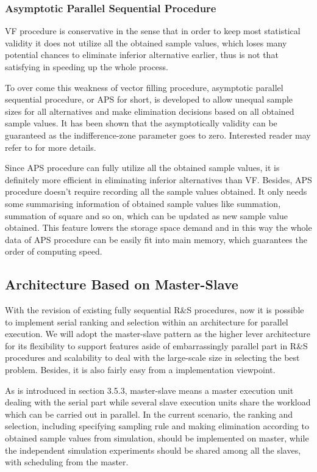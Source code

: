 \documentclass[12pt,a4paper]{report}
\begin{document}
\subsubsection{Asymptotic Parallel Sequential Procedure}

VF procedure is conservative in the sense that in order to keep most statistical validity it does not utilize all the obtained sample values, which loses many potential chances to eliminate inferior alternative earlier, thus is not that satisfying in speeding up the whole process.

To over come this weakness of vector filling procedure, asymptotic parallel sequential procedure, or APS for short, is developed to allow unequal sample sizes for all alternatives and make elimination decisions based on all obtained sample values. It has been shown that the asymptotically validity can be guaranteed as the indifference-zone parameter goes to zero. Interested reader may refer to \cite{ras-seq-parallel} for more details.

Since APS procedure can fully utilize all the obtained sample values, it is definitely more efficient in eliminating inferior alternatives than VF. Besides, APS procedure doesn't require recording all the sample values obtained. It only needs some summarising information of obtained sample values like summation, summation of square and so on, which can be updated as new sample value obtained. This feature lowers the storage space demand and in this way the whole data of APS procedure can be easily fit into main memory, which guarantees the order of computing speed.

\subsection{Architecture Based on Master-Slave}

With the revision of existing fully sequential R\&S procedures, now it is possible to implement serial ranking and selection within an architecture for parallel execution. We will adopt the master-slave pattern as the higher lever architecture for its flexibility to support features aside of embarrassingly parallel part in R\&S procedures and scalability to deal with the large-scale size in selecting the best problem. Besides, it is also fairly easy from a implementation viewpoint.

As is introduced in section 3.5.3, master-slave means a master execution unit dealing with the serial part while several slave execution units share the workload which can be carried out in parallel. In the current scenario, the ranking and selection, including specifying sampling rule and making elimination according to obtained sample values from simulation, should be implemented on master, while the independent simulation experiments should be shared among all the slaves, with scheduling from the master.
\end{document}
